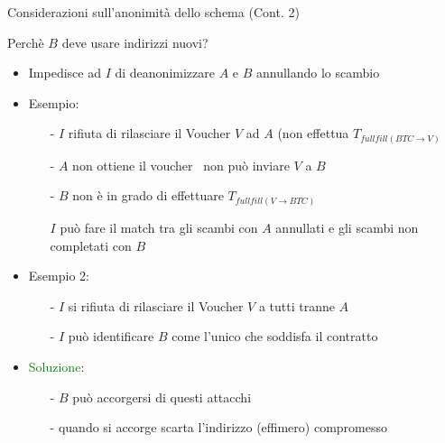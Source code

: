 \documentclass{beamer}
\begin{document}
  
  \begin{frame}{Considerazioni sull'anonimità dello schema (Cont. 2)}
      \begin{block}{Perchè $B$ deve usare indirizzi nuovi?}
          \begin{itemize}
              \item Impedisce ad $I$ di deanonimizzare $A$ e $B$ annullando lo scambio
              \item Esempio:
                \begin{itemize}
                    \item[-] $I$ rifiuta di rilasciare il Voucher $V$ ad $A$ (non effettua $T_{fullfill(BTC\rightarrow V)}$
                    \item[-] $A$ non ottiene il voucher \MVRightarrow\, non può inviare $V$ a $B$ 
                    \item[-] $B$ non è in grado di effettuare $T_{fullfill(V\rightarrow BTC)}$
                    \item[\MVRightarrow] $I$ può fare il match tra gli scambi con $A$ annullati e gli scambi non completati con $B$ 
                \end{itemize}
                \pause
               \item Esempio 2:
               \begin{itemize}
                   \item[-] $I$ si rifiuta di rilasciare il Voucher $V$ a tutti tranne $A$
                   \item[-] $I$ può identificare $B$ come l'unico che soddisfa il contratto 
               \end{itemize}
               \pause
               \item \textcolor{green}{Soluzione}:
               \begin{itemize}
                   \item[-] $B$ può accorgersi di questi attacchi 
                   \item[-] quando si accorge scarta l'indirizzo (effimero) compromesso 
               \end{itemize}
          \end{itemize}
      \end{block}
  \end{frame}
  
  
  
\end{document}
